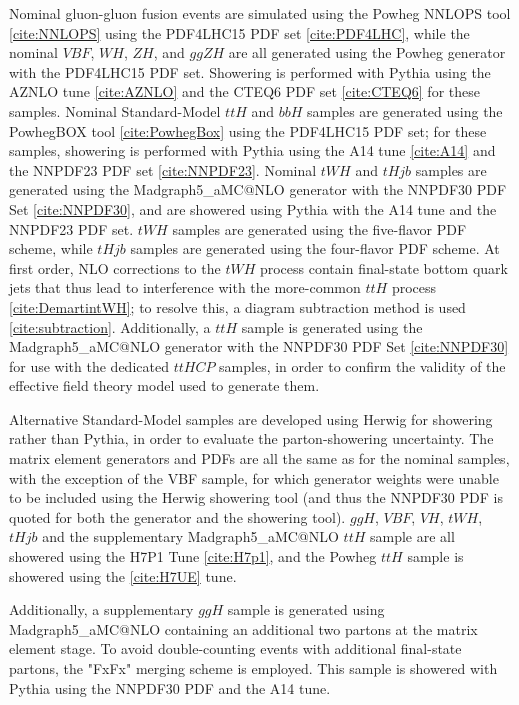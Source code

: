 Nominal gluon-gluon fusion events are simulated using the Powheg NNLOPS tool \ref{cite:NNLOPS} using the PDF4LHC15 PDF set \ref{cite:PDF4LHC}, while the nominal $VBF$, $WH$, $ZH$, and $ggZH$ are all generated using the Powheg generator with the PDF4LHC15 PDF set. Showering is performed with Pythia using the AZNLO tune \ref{cite:AZNLO} and the CTEQ6 PDF set \ref{cite:CTEQ6} for these samples. Nominal Standard-Model $ttH$ and $bbH$ samples are generated using the PowhegBOX tool \ref{cite:PowhegBox} using the PDF4LHC15 PDF set; for these samples, showering is performed with Pythia using the A14 tune \ref{cite:A14} and the NNPDF23 PDF set \ref{cite:NNPDF23}. Nominal $tWH$ and $tHjb$ samples are generated using the Madgraph5\_aMC@NLO generator with the NNPDF30 PDF Set \ref{cite:NNPDF30}, and are showered using Pythia with the A14 tune and the NNPDF23 PDF set. $tWH$ samples are generated using the five-flavor PDF scheme, while $tHjb$ samples are generated using the four-flavor PDF scheme. At first order, NLO corrections to the $tWH$ process contain final-state bottom quark jets that thus lead to interference with the more-common $ttH$ process \ref{cite:DemartintWH}; to resolve this, a diagram subtraction method is used \ref{cite:subtraction}.
Additionally, a $ttH$ sample is generated using the Madgraph5\_aMC@NLO generator with the NNPDF30 PDF Set \ref{cite:NNPDF30} for use with the dedicated $ttH CP$ samples, in order to confirm the validity of the effective field theory model used to generate them.

Alternative Standard-Model samples are developed using Herwig for showering rather than Pythia, in order to evaluate the parton-showering uncertainty. The matrix element generators and PDFs are all the same as for the nominal samples, with the exception of the VBF sample, for which generator weights were unable to be included using the Herwig showering tool (and thus the NNPDF30 PDF is quoted for both the generator and the showering tool). $ggH$, $VBF$, $VH$, $tWH$, $tHjb$ and the supplementary Madgraph5\_aMC@NLO $ttH$ sample are all showered using the H7P1 Tune \ref{cite:H7p1}, and the Powheg $ttH$ sample is showered using the \ref{cite:H7UE} tune.

Additionally, a supplementary $ggH$ sample is generated using Madgraph5\_aMC@NLO containing an additional two partons at the matrix element stage. To avoid double-counting events with additional final-state partons, the "FxFx" merging scheme is employed. This sample is showered with Pythia using the NNPDF30 PDF and the A14 tune.
 
